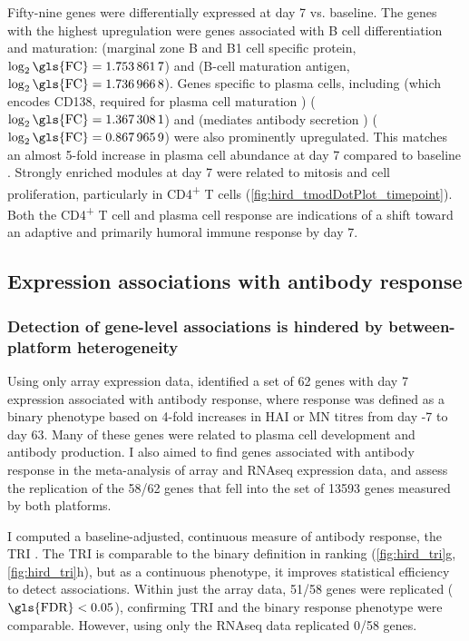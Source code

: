 Fifty-nine genes were differentially expressed at day 7 vs. baseline.
The genes with the highest upregulation were genes associated with B cell differentiation and maturation:  (marginal zone B and B1 cell specific protein, $\log_2\text{\gls{FC}} = \num{1.7538617}$) and  (B-cell maturation antigen, $\log_2\text{\gls{FC}} = \num{1.7369668}$).
Genes specific to plasma cells, including  (which encodes CD138, required for plasma cell maturation \autocite{mccarron2017CD138MediatesSelection}) ($\log_2\text{\gls{FC}} = \num{1.3673081}$) and  (mediates antibody secretion \autocite{martincic2009TranscriptionElongationFactor}) ($\log_2\text{\gls{FC}} = \num{0.8679659}$) were also prominently upregulated.
This matches an almost 5-fold increase in plasma cell abundance at day 7 compared to baseline \autocite{sobolev2016AdjuvantedInfluenzaH1N1Vaccination}.
Strongly enriched modules at day 7 were related to mitosis and cell proliferation, particularly in CD4\textsuperscript{+} T cells (\cref{fig:hird_tmodDotPlot_timepoint}).
Both the CD4\textsuperscript{+} T cell and plasma cell response are indications of a shift toward an adaptive and primarily humoral immune response by day 7.

\subsection{Expression associations with antibody response}

\subsubsection{Detection of gene-level associations is hindered by between-platform heterogeneity}

Using only array expression data, \textcite{sobolev2016AdjuvantedInfluenzaH1N1Vaccination} identified a set of 62 genes with day 7 expression associated with antibody response, 
where response was defined as a binary phenotype based on 4-fold increases in \gls{HAI} or \gls{MN} titres from day -7 to day 63.
Many of these genes were related to plasma cell development and antibody production.
I also aimed to find genes associated with antibody response in the meta-analysis of array and \gls{RNAseq} expression data,
and assess the replication of the 58/62 genes that fell into the set of \num{13593} genes measured by both platforms.

I computed a baseline-adjusted, continuous measure of antibody response, the \gls{TRI} \autocite{bucasas2011EarlyPatternsGene}.
The \gls{TRI} is comparable to the binary definition in ranking (\cref{fig:hird_tri}g, \cref{fig:hird_tri}h), but as a continuous phenotype, it improves statistical efficiency to detect associations.
Within just the array data, 51/58 genes were replicated ($\text{\gls{FDR}} < 0.05$), 
confirming \gls{TRI} and the binary response phenotype were comparable.
However, using only the \gls{RNAseq} data replicated 0/58 genes.

